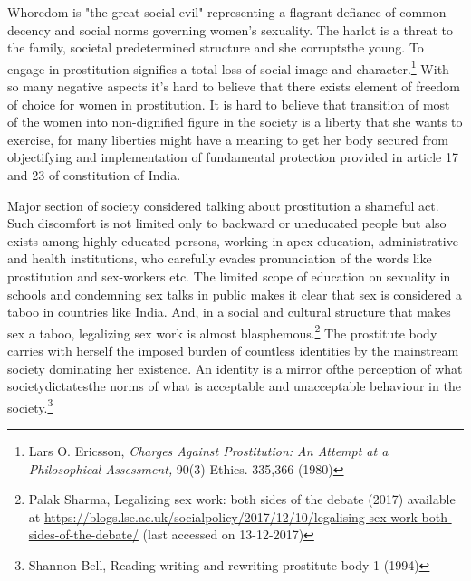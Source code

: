 \begin{multicols}{2}
\vspace{-.15cm}

\noi
Whoredom is "the great social evil" representing a flagrant defiance of common decency and
social norms governing women’s sexuality. The harlot is a threat to the family, societal predetermined structure and she corruptsthe young. To engage in prostitution signifies a total loss
of social image and character.\footnote{Lars O. Ericsson, \textit{Charges Against Prostitution: An Attempt at a Philosophical Assessment,} 90(3) Ethics. 335,366 (1980)} With so many negative aspects it’s hard to believe that there exists element of freedom of choice for women in prostitution. It is hard to believe that transition of most of the women into non-dignified figure in the society is a liberty that she
wants to exercise, for many liberties might have a meaning to get her body secured from
objectifying and implementation of fundamental protection provided in article 17 and 23 of
constitution of India.

\vspace{-.15cm}


\vspace{-.1cm}

\noi
Major section of society considered talking about prostitution a shameful act. Such discomfort
is not limited only to backward or uneducated people but also exists among highly educated
persons, working in apex education, administrative and health institutions, who carefully
evades pronunciation of the words like prostitution and sex-workers etc. The limited scope of
education on sexuality in schools and condemning sex talks in public makes it clear that sex is
considered a taboo in countries like India. And, in a social and cultural structure that makes sex
a taboo, legalizing sex work is almost blasphemous.\footnote{Palak Sharma, Legalizing sex work: both sides of the debate (2017) available at \url{https://blogs.lse.ac.uk/socialpolicy/2017/12/10/legalising-sex-work-both-sides-of-the-debate/} (last accessed on 13-12-2017)} The prostitute body carries with herself
the imposed burden of countless identities by the mainstream society dominating her existence.
An identity is a mirror ofthe perception of what societydictatesthe norms of what is acceptable
and unacceptable behaviour in the society.\footnote{Shannon Bell, Reading writing and rewriting prostitute body 1 (1994)}

\vspace{-.15cm}


\end{multicols}
